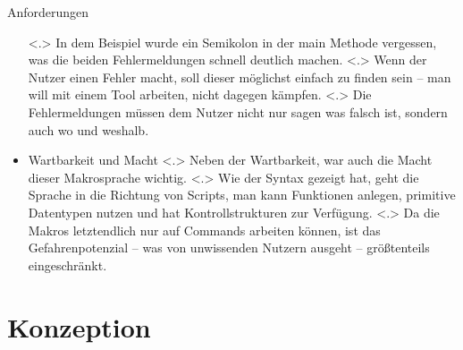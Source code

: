 \begin{frame}{Anforderungen}
\begin{itemize}
\begin{uncoverenv}
%
        \end{uncoverenv}
            \note[item]<.>{
              In dem Beispiel wurde ein Semikolon in der main Methode vergessen, was die beiden Fehlermeldungen schnell deutlich machen.
            }
            \note[item]<.>{
              Wenn der Nutzer einen Fehler macht, soll dieser möglichst einfach zu finden sein -- man will mit einem Tool arbeiten, nicht dagegen kämpfen.
            }
            \note[item]<.>{
              Die Fehlermeldungen müssen dem Nutzer nicht nur sagen was falsch ist, sondern auch wo und weshalb.
            }
        \item<+- | alert@+>
          Wartbarkeit und Macht
              \note[item]<.>{
                Neben der Wartbarkeit, war auch die Macht dieser Makrosprache wichtig.
              }
              \note[item]<.>{
                Wie der Syntax gezeigt hat, geht die Sprache in die Richtung von Scripts, man kann Funktionen anlegen, primitive Datentypen nutzen und hat Kontrollstrukturen zur Verfügung.
              }
              \note[item]<.>{
                Da die Makros letztendlich nur auf Commands arbeiten können, ist das Gefahrenpotenzial -- was von unwissenden Nutzern ausgeht -- größtenteils eingeschränkt.
              }
    \end{itemize}
  \end{frame}

\section{Konzeption}

